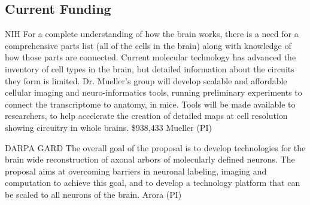 \documentclass[10pt,colorlinks=true,urlcolor=blue]{moderncv}
\begin{document}
\subsection{Current Funding}


%
    {NIH}%
    {For a complete understanding of how the brain works, there is a
        need for a comprehensive parts list (all of the cells in the
        brain) along with knowledge of how those parts are connected.
        Current molecular technology has advanced the inventory of cell
        types in the brain, but detailed information about the circuits
        they form is limited. Dr. Mueller’s group will develop scalable
        and affordable cellular imaging and neuro-informatics tools,
        running preliminary experiments to connect the transcriptome to
        anatomy, in mice. Tools will be made available to researchers,
        to help accelerate the creation of detailed maps at cell
        resolution showing circuitry in whole brains.}
    {\$938,433}
    {Mueller (PI)}{}

    {DARPA GARD}%
    { The overall goal of the proposal is to develop technologies for the brain wide reconstruction of axonal arbors of molecularly defined neurons. The proposal aims at overcoming barriers in neuronal labeling, imaging and computation to achieve this goal, and to develop a technology platform that can be scaled to all neurons of the brain.}
    {}
    {Arora (PI)}{}
\end{document}
